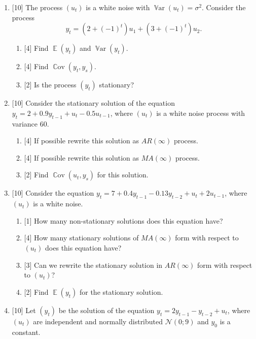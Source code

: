 \documentclass[12pt]{article}
\DeclareMathOperator{\Cov}{\mathbb{C}ov}
\DeclareMathOperator{\Var}{\mathbb{V}ar}
\DeclareMathOperator{\E}{\mathbb{E}}
\newcommand{\cN}{\mathcal{N}}
\begin{document}
\begin{enumerate}
    \item {[10]} The process $(u_t)$ is a white noise with $\Var(u_t) = \sigma^2$.
    Consider the process 
    \[
    y_t = (2 + (-1)^t) u_1 + (3 + (-1)^t) u_2.
    \]
    \begin{enumerate}
        \item {[4]} Find $\E(y_t)$ and $\Var(y_t)$.
        \item {[4]} Find $\Cov(y_t, y_s)$.
        \item {[2]} Is the process $(y_t)$ stationary?
    \end{enumerate}

    \item {[10]} Consider the stationary solution of the equation 
    $y_t = 2 + 0.9 y_{t-1} + u_t - 0.5 u_{t-1}$,    
    where $(u_t)$ is a white noise process with variance $60$. 
    \begin{enumerate}
        \item {[4]} If possible rewrite this solution as $AR(\infty)$ process. 
        \item {[4]} If possible rewrite this solution as $MA(\infty)$ process. 
        \item {[2]} Find $\Cov(u_t, y_s)$ for this solution. 
    \end{enumerate}
    \item {[10]} Consider the equation 
    $y_t = 7 +0.4 y_{t-1} - 0.13 y_{t-2} + u_t + 2u_{t-1}$,
    where $(u_t)$ is a white noise. 

    \begin{enumerate}
        \item {[1]} How many non-stationary solutions does this equation have?
        \item {[4]} How many stationary solutions of $MA(\infty)$ form with respect to $(u_t)$ does this equation have?
        \item {[3]} Can we rewrite the stationary solution in $AR(\infty)$ form with respect to $(u_t)$?
        \item {[2]} Find $\E(y_t)$ for the stationary solution.
    \end{enumerate}

    \newpage

    \item {[10]} Let $(y_t)$ be the solution of the equation 
    $y_t = 2 y_{t-1} - y_{t-2} + u_t$,
    where $(u_t)$ are independent and normally distributed $\cN(0;9)$ and $y_0$ is a constant.


\end{enumerate}
\end{document}
